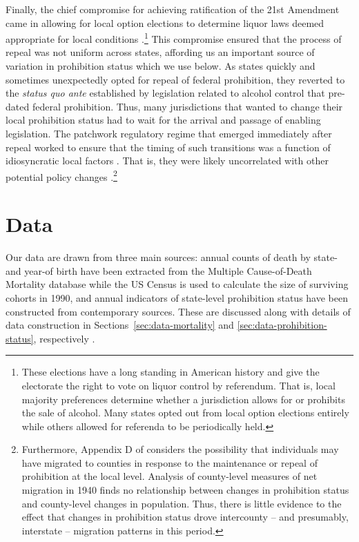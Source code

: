 \documentclass[12pt]{article}
\begin{document}
Finally, the chief compromise for achieving ratification of the 21st Amendment came in allowing for local option elections to determine liquor laws deemed appropriate for local conditions .\footnote{These elections have a long standing in American history and give the electorate the right to vote on liquor control by referendum. 
That is, local majority preferences determine whether a jurisdiction allows for or prohibits the sale of alcohol. 
Many states opted out from local option elections entirely while others allowed for referenda to be periodically held.} 
This compromise ensured that the process of repeal was not uniform across states, affording us an important source of variation in prohibition status which we use below. 
As states quickly and sometimes unexpectedly opted for repeal of federal prohibition, they reverted to the \emph{status quo ante} established by legislation related to alcohol control that pre-dated federal prohibition. 
Thus, many jurisdictions that wanted to change their local prohibition status had to wait for the arrival and passage of enabling legislation. 
The patchwork regulatory regime that emerged immediately after repeal worked to ensure that the timing of such transitions was a function of idiosyncratic local factors . 
That is, they were likely uncorrelated with other potential policy changes .\footnote{Furthermore, Appendix D of  considers the possibility that individuals may have migrated to counties in response to the maintenance or repeal of prohibition at the local level. 
Analysis of county-level measures of net migration in 1940 finds no relationship between changes in prohibition status and county-level changes in population. 
Thus, there is little evidence to the effect that changes in prohibition status drove intercounty -- and presumably, interstate -- migration patterns in this period.
}


\section{Data} \label{sec:data}

Our data are drawn from three main sources: annual counts of death by state- and year-of birth have been extracted from the Multiple Cause-of-Death Mortality database while the US Census is used to calculate the size of surviving cohorts in 1990, and annual indicators of state-level prohibition status have been constructed from contemporary sources. 
These are discussed along with details of data construction in Sections~\ref{sec:data-mortality} and \ref{sec:data-prohibition-status}, respectively . 
\end{document}
